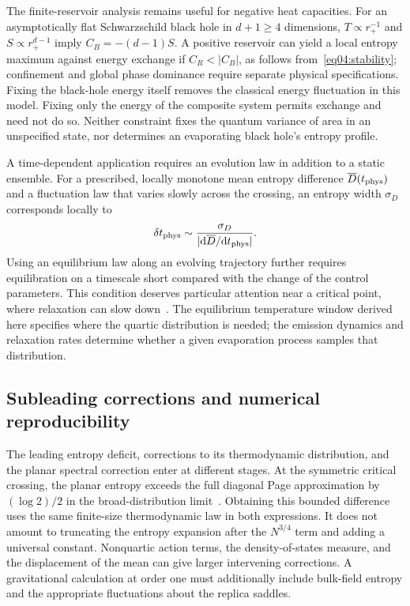 \documentclass[11pt,letterpaper]{article}
\newcommand{\dd}{\mathrm{d}}
\theoremstyle{plain}
\theoremstyle{definition}
\theoremstyle{remark}
\begin{document}
The finite-reservoir analysis remains useful for negative heat capacities. For an asymptotically flat Schwarzschild black hole in $d+1\geq4$ dimensions, $T\propto r_+^{-1}$ and $S\propto r_+^{d-1}$ imply $C_B=-(d-1)S$. A positive reservoir can yield a local entropy maximum against energy exchange if $C_R<|C_B|$, as follows from~\eqref{eq04:stability}; confinement and global phase dominance require separate physical specifications. Fixing the black-hole energy itself removes the classical energy fluctuation in this model. Fixing only the energy of the composite system permits exchange and need not do so. Neither constraint fixes the quantum variance of area in an unspecified state, nor determines an evaporating black hole's entropy profile.

A time-dependent application requires an evolution law in addition to a static ensemble. For a prescribed, locally monotone mean entropy difference $\overline D(t_{\rm phys})$ and a fluctuation law that varies slowly across the crossing, an entropy width $\sigma_D$ corresponds locally to
\begin{equation}
 \delta t_{\rm phys}\sim
 \frac{\sigma_D}{|\dd\overline D/\dd t_{\rm phys}|}.
 \label{eq07:time}
\end{equation}
Using an equilibrium law along an evolving trajectory further requires equilibration on a timescale short compared with the change of the control parameters. This condition deserves particular attention near a critical point, where relaxation can slow down~\cite{awal2026}. The equilibrium temperature window derived here specifies where the quartic distribution is needed; the emission dynamics and relaxation rates determine whether a given evaporation process samples that distribution.

\subsection{Subleading corrections and numerical reproducibility}
\label{sec07:numerics}

The leading entropy deficit, corrections to its thermodynamic distribution, and the planar spectral correction enter at different stages. At the symmetric critical crossing, the planar entropy exceeds the full diagonal Page approximation by $(\log2)/2$ in the broad-distribution limit~\cite{wuebben2026}. Obtaining this bounded difference uses the same finite-size thermodynamic law in both expressions. It does not amount to truncating the entropy expansion after the $N^{3/4}$ term and adding a universal constant. Nonquartic action terms, the density-of-states measure, and the displacement of the mean can give larger intervening corrections. A gravitational calculation at order one must additionally include bulk-field entropy and the appropriate fluctuations about the replica saddles.
\end{document}
